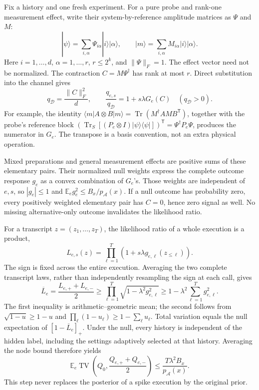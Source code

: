 \documentclass[11pt,a4paper]{article}
\numberwithin{equation}{section}
\theoremstyle{definition}
\theoremstyle{remark}
\newcommand{\Dep}{\mathcal D}
\begin{document}
Fix a history and one fresh experiment. For a pure probe and rank-one measurement effect, write their system-by-reference amplitude matrices as \(\Psi\) and \(M\):
\[
 |\psi\rangle=\sum_{i,\alpha}\Psi_{i\alpha}|i\rangle|\alpha\rangle,
 \qquad |m\rangle=\sum_{i,\alpha}M_{i\alpha}|i\rangle|\alpha\rangle .
\]
Here \(i=1,\ldots,d\), \(\alpha=1,\ldots,r\), \(r\leq2^k\), and \(\|\Psi\|_F=1\). The effect vector need not be normalized. The contraction \(C=M\Psi^\dagger\) has rank at most \(r\). Direct substitution into the channel gives
\begin{equation}
 q_{\Dep}=\frac{\|C\|_F^2}{d},\qquad
 \frac{q_{e,s}}{q_{\Dep}}=1+s\lambda G_e(C)
 \quad(q_{\Dep}>0).
 \label{eq:plmt-likelihood}
\end{equation}
For example, the identity
\(\langle m|A\otimes B|m\rangle=\operatorname{Tr}(M^\dagger A M B^{\mathsf T})\),
together with the probe's reference block
\((\operatorname{Tr}_S[(P_e\otimes I)|\psi\rangle\langle\psi|])^{\mathsf T}
=\Psi^\dagger P_e\Psi\),
produces the numerator in \(G_e\). The transpose is a basis convention, not an extra physical operation.

Mixed preparations and general measurement effects are positive sums of these elementary pairs. Their normalized null weights express the complete outcome response \(g_e\) as a convex combination of \(G_e\)'s. Those weights are independent of \(e,s\), so \(|g_e|\leq1\) and
\(\mathbb E_e g_e^2\leq B_x/p_{\mathcal A}(x)\).
If a null outcome has probability zero, every positively weighted elementary pair has \(C=0\), hence zero signal as well. No missing alternative-only outcome invalidates the likelihood ratio.

For a transcript \(z=(z_1,\ldots,z_T)\), the likelihood ratio of a whole execution is a product,
\[
 L_{e,s}(z)=\prod_{\ell=1}^T
 (1+s\lambda g_{e,\ell}(z_{\leq\ell})).
\]
The sign is fixed across the entire execution. Averaging the two complete transcript laws, rather than independently resampling the sign at each call, gives
\[
 \overline L_e=\frac{L_{e,+}+L_{e,-}}2
 \geq\prod_{\ell=1}^T\sqrt{1-\lambda^2g_{e,\ell}^2}
 \geq1-\lambda^2\sum_{\ell=1}^Tg_{e,\ell}^2.
\]
The first inequality is arithmetic--geometric mean; the second follows from
\(\sqrt{1-u}\geq1-u\) and \(\prod_\ell(1-u_\ell)\geq1-\sum_\ell u_\ell\).
Total variation equals the null expectation of \([1-\overline L_e]_+\).
Under the null, every history is independent of the hidden label, including the settings adaptively selected at that history. Averaging the node bound therefore yields
\[
 \mathbb E_e\operatorname{TV}
 \left(Q_0,\frac{Q_{e,+}+Q_{e,-}}2\right)
 \leq\frac{T\lambda^2B_x}{p_{\mathcal A}(x)}.
\]
This step never replaces the posterior of a spike execution by the original prior.
\end{document}
